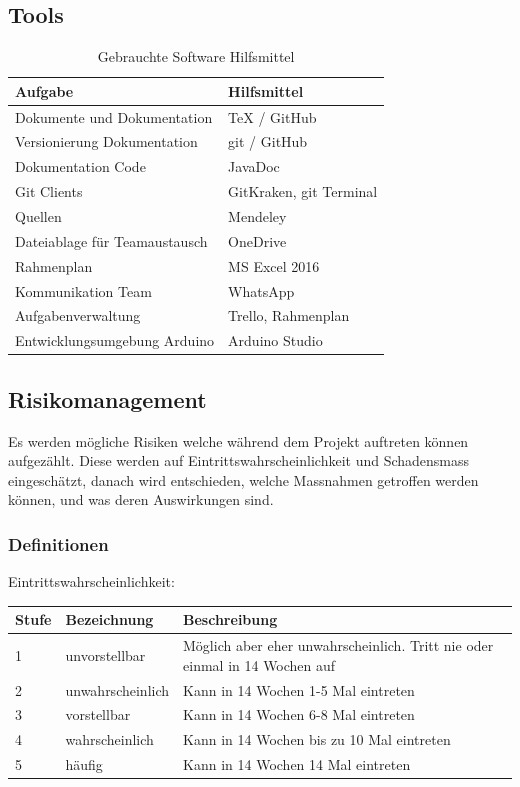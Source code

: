 \documentclass[a4paper]{scrreprt}
\begin{document}
\subsection{Tools}
\label{sec:Tools}
\begin{table}[h!]
	\begin{tabular}{|p{}|p{}|}
		\hline
		\textbf{Aufgabe} & \textbf{Hilfsmittel} \\
		\hline
		Dokumente und Dokumentation & TeX / GitHub \\
		\hline
		Versionierung Dokumentation & git / GitHub\\
		\hline
		Dokumentation Code & JavaDoc \\
		\hline
		Git Clients & GitKraken, git Terminal\\
		\hline
		Quellen & Mendeley \\
		\hline
		Dateiablage für Teamaustausch & OneDrive \\
		\hline
		Rahmenplan & MS Excel 2016 \\
		\hline
		Kommunikation Team & WhatsApp\\
		\hline
		Aufgabenverwaltung & Trello, Rahmenplan\\
		\hline
		Entwicklungsumgebung Arduino & Arduino Studio\\
		\hline
	\end{tabular}
	\caption{Gebrauchte Software Hilfsmittel}
	\label{tab:SWTools}
\end{table}

\subsection{Risikomanagement}

Es werden mögliche Risiken welche während dem Projekt auftreten können aufgezählt. Diese werden auf Eintrittswahrscheinlichkeit und Schadensmass eingeschätzt, danach wird entschieden, welche Massnahmen getroffen werden können, und was deren Auswirkungen sind.

\subsubsection{Definitionen}
\label{sssec:Def}
\vspace{1em}
\noindent
Eintrittswahrscheinlichkeit:

\vspace{1em}
\noindent
\begin{tabular}{|p{}|p{}|p{}|}
	\hline
	\textbf{Stufe} & \textbf{Bezeichnung} & \textbf{Beschreibung} \\
	\hline
	1 & unvorstellbar & Möglich aber eher unwahrscheinlich. Tritt nie oder einmal in 14 Wochen auf \\
	\hline
	2 & unwahrscheinlich & Kann in 14 Wochen 1-5 Mal eintreten\\
	\hline
	3 & vorstellbar & Kann in 14 Wochen 6-8 Mal eintreten \\
	\hline
	4 & wahrscheinlich & Kann in 14 Wochen bis zu 10 Mal eintreten \\
	\hline
	5 & häufig & Kann in 14 Wochen 14 Mal eintreten\\
	\hline
\end{tabular}
\end{document}
